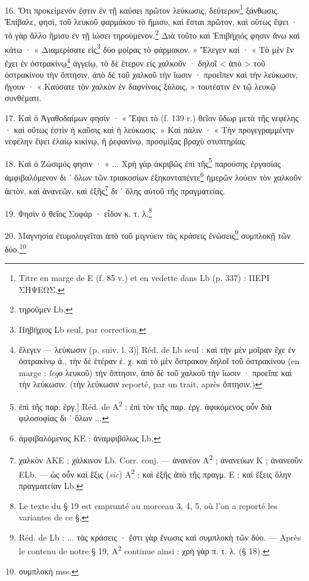 \documentclass[a4paper, 11pt, oneside, polutonikogreek, french]{article}
\begin{document}
\paragraph{}
16. Ὅτι προκείμενόν ἐστιν ἐν τῇ καύσει πρῶτον λεύκωσις, δεύτερον\footnote{Titre en marge de E (f. 85 v.) et en vedette dans Lb (p. 337) : ΠΕΡΙ ΣΗΨΕΩΣ.} ξάνθωσις. Ἐπίβαλε, φησὶ, τοῦ λευκοῦ φαρμάκου τὸ ἥμισυ, καὶ ἔσται πρῶτον, καὶ οὕτως ἕψει · τὸ γὰρ ἄλλο ἥμισυ ἐν τῇ ἰώσει τηρούμενον.\footnote{τηροῦμεν Lb.} Διὰ τοῦτο καὶ Ἐπιβήχιός φησιν ἄνω καὶ κάτω · « Διαμερίσατε εἰς\footnote{Πηβήχιος Lb seul, par correction.} δύο μοίρας τὸ φάρμακον. » Ἔλεγεν καί · « Τὸ μὲν ἓν ἔχει ἐν ὀστρακίνῳ\footnote{ἔλεγεν --- λεύκωσιν (p. suiv. l. 3)] Réd. de Lb seul : καὶ τὴν μὲν μοῖραν ἔχε ἐν ὀστρακίνῳ ἀ., τὴν δὲ ἑτέραν ἐ. χ. καὶ τὸ μὲν ὄστρακον δηλοῖ τοῦ ὀστρακίνου (en marge : \emph{legο} λευκοῦ) τὴν ὄπτησιν, ἀπὸ δὲ τοῦ χαλκοῦ τὴν ἴωσιν · προεῖπε καὶ τὴν λεύκωσιν. (τὴν λεύκωσιν reporté, par un trait, après ὄπτησιν.)} ἀγγείῳ, τὸ δὲ ἕτερον εἰς χαλκοῦν · δηλοῖ < ἀπὸ > τοῦ ὀστρακίνου τὴν ὄπτησιν, ἀπὸ δὲ τοῦ χαλκοῦ τὴν ἴωσιν · προεῖπεν καὶ τὴν λεύκωσιν, ἤγουν · « Καύσατε τὸν χαλκὸν ἐν δαφνίνοις ξύλοις, » τουτέστιν ἐν τῷ λευκῷ συνθέματι.

17. Καὶ ὁ Ἀγαθοδαίμων φησίν · « Ἕψει τὸ (f. 139 r.) θεῖον ὕδωρ μετὰ τῆς νεφέλης · καὶ οὕτως ἐστὶν ἡ καῦσις καὶ ἡ λεύκωσις. » Καὶ πάλιν · « Τὴν προγεγραμμένην νεφέλην ἕψει ἐλαίῳ κικίνῳ, ἢ ῥεφανίνῳ, προσμίξας βραχὺ στυπτηρίας.

18. Καὶ ὁ Ζώσιμός φησιν · « ... Χρὴ γὰρ ἀκριβῶς ἐπὶ τῆς\footnote{ἐπὶ τῆς παρ. ἐργ.] Réd. de A\textsuperscript{2} : ἐπὶ τὸν τῆς παρ. ἐργ. ἀφικόμενος οὖν διὰ φιλοσοφίας δι ᾽ ὅλων ...} παρούσης ἐργασίας ἀμφιβαλόμενον δι ᾽ ὅλων τῶν τριακοσίων ἐξηκονταπέντε\footnote{ἀμφιβαλόμενος KE ; ἀναμφιβόλως Lb.} ἡμερῶν λούειν τὸν χαλκοῦν ἀετὸν, καὶ ἀνανεῶν, καὶ ἑξῆς\footnote{χαλκὸν AKE ; χάλκινον Lb. Corr. conj. --- ἀνανέον A\textsuperscript{2} ; ἀνανεύων K ; ἀνανεοῦν ELb. --- ὡς οὖν καὶ ἔξις (\emph{sic}) A\textsuperscript{2} ; καὶ ἑξῆς ἀπὸ τῆς πραγμ. E ; καὶ ἕξεις ὅλην πραγματείαν Lb.} δι ᾽ ὅλης αὐτοῦ τῆς πραγματείας.

19. Φησὶν ὁ θεῖος Σοφάρ · εἶδον κ. τ. λ.\footnote{Le texte du § 19 est emprunté au morceau 3, 4, 5, où l'on a reporté les variantes de ce §.}

20. Μαγνησία ἐτυμολογεῖται ἀπὸ τοῦ μιγνύειν τὰς κράσεις ἐνώσεις\footnote{Réd. de Lb : ... τὰς κράσεις · ἔστι γὰρ ἕνωσις καὶ συμπλοκὴ τῶν δύο. --- Après le contenu de notre § 19, A\textsuperscript{2} continue ainsi : χρὴ γὰρ π. τ. λ. (§ 18).} συμπλοκῇ τῶν δύο.\footnote{συμπλοκὴ mss.}
\end{document}
